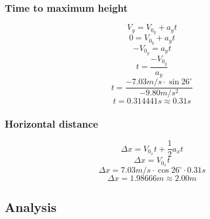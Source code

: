 \documentclass[11pt, letterpaper, includehead]{article}
\begin{document}
\subsubsection{Time to maximum height} %
$$V_y = V_{0_y} + a_yt$$
$$0 = V_{0_y} + a_yt$$
$$-V_{0_y} = a_yt$$
$$t = \frac{-V_{0_y}}{a_y}$$
$$t = \frac{-7.03m/s\cdot\sin26^{\circ}}{-9.80m/s^2}$$
$$t = 0.314441s \approx 0.31s$$
\subsubsection{Horizontal distance} %
$$\Delta x = V_{0_x}t + \frac{1}{2}a_xt$$
$$\Delta x = V_{0_x}t$$
$$\Delta x = 7.03m/s\cdot \cos26^{\circ}\cdot 0.31s$$
$$\Delta x = 1.98666m \approx 2.00m$$
\subsection{Analysis}  %
\end{document}
